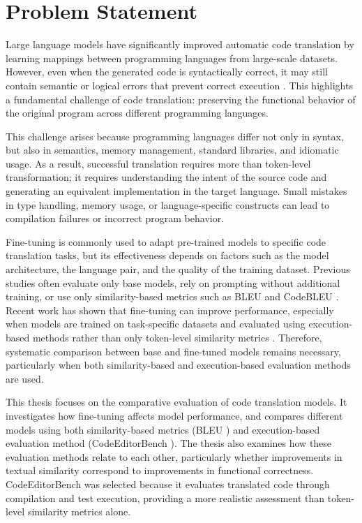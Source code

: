 \section{Problem Statement}

Large language models have significantly improved automatic code translation by
learning mappings between programming languages from large-scale datasets.
However, even when the generated code is syntactically correct, it may still
contain semantic or logical errors that prevent correct execution
\cite{llm_limitations, correctness_llm}. This highlights a fundamental challenge
of code translation: preserving the functional behavior of the original program
across different programming languages.


This challenge arises because programming languages differ not only in syntax,
but also in semantics, memory management, standard libraries, and idiomatic
usage. As a result, successful translation requires more than token-level
transformation; it requires understanding the intent of the source code and
generating an equivalent implementation in the target language. Small mistakes
in type handling, memory usage, or language-specific constructs can lead to
compilation failures or incorrect program behavior.

Fine-tuning is commonly used to adapt pre-trained models to specific code
translation tasks, but its effectiveness depends on factors such as the model
architecture, the language pair, and the quality of the training dataset.
Previous studies often evaluate only base models, rely on prompting without 
additional training, or use only similarity-based metrics such as BLEU and
CodeBLEU \cite{aljagthami2025prompt, yang2024llm}. Recent work has shown that
fine-tuning can improve performance, especially when models are trained on
task-specific datasets and evaluated using execution-based methods rather than
only token-level similarity metrics \cite{peft_code}. Therefore,
systematic comparison between base and fine-tuned models remains necessary,
particularly when both similarity-based and execution-based evaluation methods
are used.

This thesis focuses on the comparative evaluation of code translation models. It
investigates how fine-tuning affects model performance, and compares different
models using both similarity-based metrics (BLEU  \cite{bleu_metric}) and execution-based evaluation
method (CodeEditorBench \cite{codeeditorbench}).
The thesis also examines how these evaluation
methods relate to each other, particularly whether improvements in textual
similarity correspond to improvements in functional correctness. CodeEditorBench
was selected because it evaluates translated code through compilation and test
execution, providing a more realistic assessment than token-level similarity
metrics alone.
